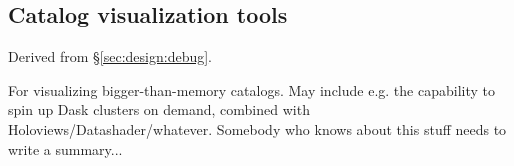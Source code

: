 \subsection{Catalog visualization tools}


Derived from \S\ref{sec:design:debug}.

For visualizing bigger-than-memory catalogs. May include e.g. the capability
to spin up Dask clusters on demand, combined with
Holoviews/Datashader/whatever. Somebody who knows about this stuff needs to
write a summary...
